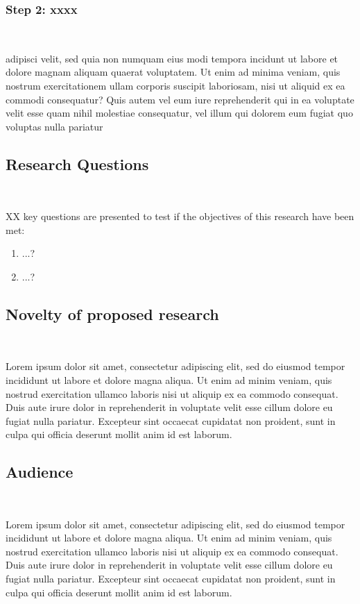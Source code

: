\subsubsection*{Step 2: xxxx}\


adipisci velit, sed quia non numquam eius modi tempora incidunt ut labore et dolore magnam aliquam quaerat voluptatem. Ut enim ad minima veniam, quis nostrum exercitationem ullam corporis suscipit laboriosam, nisi ut aliquid ex ea commodi consequatur? Quis autem vel eum iure reprehenderit qui in ea voluptate velit esse quam nihil molestiae consequatur, vel illum qui dolorem eum fugiat quo voluptas nulla pariatur



\subsection{Research Questions}\

XX key questions are presented to test if the objectives of this research have been met:
\begin{enumerate}
	\item ...?
	\item ...?
\end{enumerate}



\subsection{Novelty of proposed research}\

Lorem ipsum dolor sit amet, consectetur adipiscing elit, sed do eiusmod tempor incididunt ut labore et dolore magna aliqua. Ut enim ad minim veniam, quis nostrud exercitation ullamco laboris nisi ut aliquip ex ea commodo consequat. Duis aute irure dolor in reprehenderit in voluptate velit esse cillum dolore eu fugiat nulla pariatur. Excepteur sint occaecat cupidatat non proident, sunt in culpa qui officia deserunt mollit anim id est laborum.


\subsection{Audience}\

Lorem ipsum dolor sit amet, consectetur adipiscing elit, sed do eiusmod tempor incididunt ut labore et dolore magna aliqua. Ut enim ad minim veniam, quis nostrud exercitation ullamco laboris nisi ut aliquip ex ea commodo consequat. Duis aute irure dolor in reprehenderit in voluptate velit esse cillum dolore eu fugiat nulla pariatur. Excepteur sint occaecat cupidatat non proident, sunt in culpa qui officia deserunt mollit anim id est laborum.

